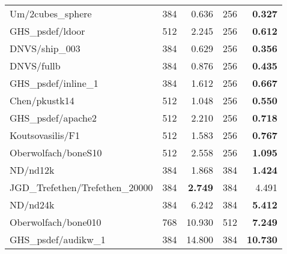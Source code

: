 \begin{tabular}{l|rr|rr}
  Um/2cubes\_sphere               & 384                       & 0.636     & 256 & \bf 0.327  \\
  GHS\_psdef/ldoor                & 512                       & 2.245     & 256 & \bf 0.612  \\
  DNVS/ship\_003                  & 384                       & 0.629     & 256 & \bf 0.356  \\
  DNVS/fullb                      & 384                       & 0.876     & 256 & \bf 0.435  \\
  GHS\_psdef/inline\_1            & 384                       & 1.612     & 256 & \bf 0.667  \\
  Chen/pkustk14                   & 512                       & 1.048     & 256 & \bf 0.550  \\
  GHS\_psdef/apache2              & 512                       & 2.210     & 256 & \bf 0.718  \\
  Koutsovasilis/F1                & 512                       & 1.583     & 256 & \bf 0.767  \\
  Oberwolfach/boneS10             & 512                       & 2.558     & 256 & \bf 1.095  \\
  ND/nd12k                        & 384                       & 1.868     & 384 & \bf 1.424  \\
  JGD\_Trefethen/Trefethen\_20000 & 384                       & \bf 2.749 & 384 & 4.491      \\
  ND/nd24k                        & 384                       & 6.242     & 384 & \bf 5.412  \\
  Oberwolfach/bone010             & 768                       & 10.930    & 512 & \bf 7.249  \\
  GHS\_psdef/audikw\_1            & 384                       & 14.800    & 384 & \bf 10.730 \\
  \hline
\end{tabular}
